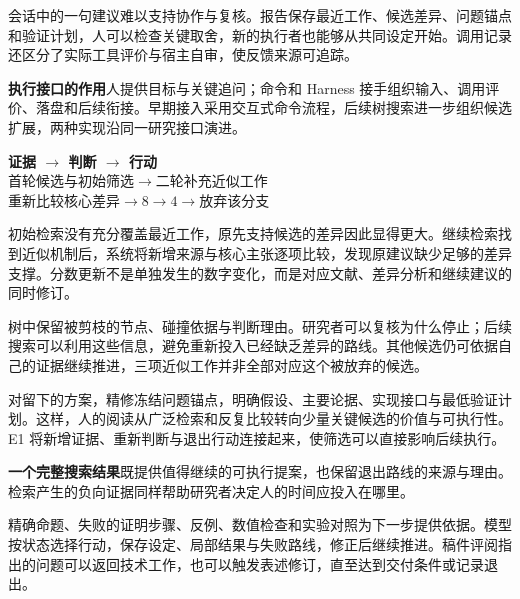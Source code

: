 会话中的一句建议难以支持协作与复核。报告保存最近工作、候选差异、问题锚点和验证计划，人可以检查关键取舍，新的执行者也能够从共同设定开始。调用记录还区分了实际工具评价与宿主自审，使反馈来源可追踪。

\begin{insight}
\textbf{执行接口的作用}\quad 人提供目标与关键追问；命令和 Harness 接手组织输入、调用评价、落盘和后续衔接。早期接入采用交互式命令流程，后续树搜索进一步组织候选扩展，两种实现沿同一研究接口演进。
\end{insight}

\begin{insight}
\textbf{证据 $\to$ 判断 $\to$ 行动}\\[1mm]
首轮候选与初始筛选\quad $\longrightarrow$\quad 二轮补充近似工作\\[1mm]
重新比较核心差异\quad $\longrightarrow$\quad $8\to4$\quad $\longrightarrow$\quad 放弃该分支
\end{insight}

初始检索没有充分覆盖最近工作，原先支持候选的差异因此显得更大。继续检索找到近似机制后，系统将新增来源与核心主张逐项比较，发现原建议缺少足够的差异支撑。分数更新不是单独发生的数字变化，而是对应文献、差异分析和继续建议的同时修订。

树中保留被剪枝的节点、碰撞依据与判断理由。研究者可以复核为什么停止；后续搜索可以利用这些信息，避免重新投入已经缺乏差异的路线。其他候选仍可依据自己的证据继续推进，三项近似工作并非全部对应这个被放弃的候选。

对留下的方案，精修冻结问题锚点，明确假设、主要论据、实现接口与最低验证计划。这样，人的阅读从广泛检索和反复比较转向少量关键候选的价值与可执行性。E1 将新增证据、重新判断与退出行动连接起来，使筛选可以直接影响后续执行。

\begin{insight}
\textbf{一个完整搜索结果}\quad 既提供值得继续的可执行提案，也保留退出路线的来源与理由。检索产生的负向证据同样帮助研究者决定人的时间应投入在哪里。
\end{insight}

精确命题、失败的证明步骤、反例、数值检查和实验对照为下一步提供依据。模型按状态选择行动，保存设定、局部结果与失败路线，修正后继续推进。稿件评阅指出的问题可以返回技术工作，也可以触发表述修订，直至达到交付条件或记录退出。

